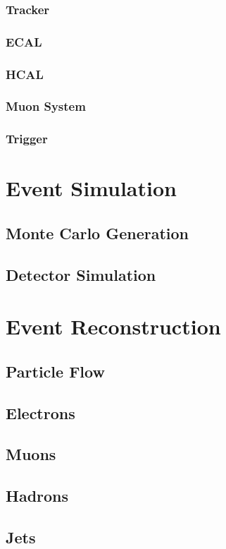 \documentclass{article}
\begin{document}
\subsubsection{Tracker}
\subsubsection{ECAL}
\subsubsection{HCAL}
\subsubsection{Muon System}
\subsubsection{Trigger}

\section{Event Simulation}
\subsection{Monte Carlo Generation}
\subsection{Detector Simulation}


\section{Event Reconstruction}
\subsection{Particle Flow}
\subsection{Electrons}
\subsection{Muons}
\subsection{Hadrons}
\subsection{Jets}
\end{document}
